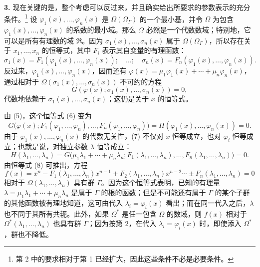 \textbf{3.} 现在关键的是，整个考虑可以反过来，并且确实给出所要求的参数表示的充分条件。\footnote{第 2 中的要求相对于第 1 已经扩大，因此这些条件不必是必要条件。} 设 $\varphi_1(x),\ldots,\varphi_n(x)$ 是 $\Omega(\Omega_\Gamma)$ 的一个最小基，并令 $\Omega$ 为包含 $\varphi_1(x),\ldots,\varphi_n(x)$ 的系数的最小域。那么 $\Omega$ 必然是一个代数数域；特别地，它可以是所有有理数的域 $\mathfrak R$。因为 $\sigma_1(x),\ldots,\sigma_n(x)$ 属于 $\Omega(\Omega_\Gamma)$，所以存在关于 $x_1,
\ldots,x_n$ 的恒等式，其中 $F_i$ 表示其自变量的有理函数：
\begin{equation}\tag{5}
\sigma_1(x)=F_1(\varphi_1(x),\ldots,\varphi_n(x));\quad\ldots;\quad
\sigma_n(x)=F_n(\varphi_1(x),\ldots,\varphi_n(x)).
\end{equation}
反过来，$\varphi_1(x),\ldots,\varphi_n(x)$，因而还有 $\varphi(x)=\mu_1\varphi_1(x)+\cdots+\mu_n\varphi_n(x)$，通过相对于 $\Omega(\sigma_1(x),\ldots,\sigma_n(x))$ 不可约的方程
\begin{equation}\tag{6}
G(\varphi(x);\sigma_1(x),\ldots,\sigma_n(x))=0,
\end{equation}
代数地依赖于 $\sigma_1(x),\ldots,\sigma_n(x)$；这仍是关于 $x$ 的恒等式。

由 (5)，这个恒等式 (6) 变为
\begin{equation}\tag{7}
G\bigl(\varphi(x);F_1(\varphi_1,
\ldots,\varphi_n),\ldots,F_n(\varphi_1,
\ldots,\varphi_n)\bigr)
=H(\varphi_1(x),\ldots,\varphi_n(x))=0.
\end{equation}
由于 $\varphi_1(x),\ldots,\varphi_n(x)$ 的代数无关性，(7) 不仅对 $x$ 恒等成立，也对 $\varphi_i$ 恒等成立；也就是说，对独立参数 $\lambda$ 恒等成立：
\begin{equation}\tag{8}
H(\lambda_1,
\ldots,\lambda_n)=G\bigl(\mu_1\lambda_1+\cdots+\mu_n\lambda_n;
F_1(\lambda_1,
\ldots,\lambda_n),\ldots,F_n(\lambda_1,
\ldots,\lambda_n)\bigr)=0.
\end{equation}
由恒等式 (8) 可推出，方程
\begin{equation}\tag{9}
f(x)=x^n-F_1(\lambda_1,
\ldots,\lambda_n)x^{n-1}+F_2(\lambda_1,
\ldots,\lambda_n)x^{n-2}\cdots \pm F_n(\lambda_1,
\ldots,\lambda_n)=0
\end{equation}
相对于 $\Omega(\lambda_1,
\ldots,\lambda_n)$ 具有群 $\Gamma$。因为这个恒等式表明，已知的有理量 $\lambda=\mu_1\lambda_1+\cdots+\mu_n\lambda_n$ 是属于 $\Gamma$ 的根的函数；但是不可能还有属于 $\Gamma$ 的某个子群的其他函数被有理地知道，这可由代入 $\lambda_i=\varphi_i(x)$ 看出；而在同一代入之后，$\lambda$ 也不同于其所有共轭。此外，如果 $\Omega^*$ 是任一包含 $\Omega$ 的数域，则 $f(x)$ 相对于 $\Omega^*(\lambda_1,
\ldots,\lambda_n)$ 也具有群 $\Gamma$；因为按第 2，在代入 $\lambda_i=\varphi_i(x)$ 时，即使添入 $\Omega^*$，群也不降低。

